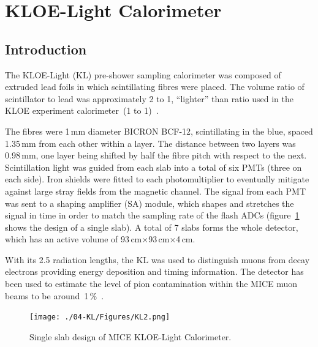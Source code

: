 \graphicspath{{04-KL/Figures/}}

\section{KLOE-Light Calorimeter}
\label{Sect:KL}

\subsection{Introduction}
\label{SubSect:KL_Intro}

The KLOE-Light (KL) pre-shower sampling calorimeter was composed of extruded lead foils in which scintillating fibres were placed. The volume ratio of scintillator to lead was approximately 2 to 1, ``lighter'' than ratio used in the KLOE experiment calorimeter~(1 to 1)~\cite{Ambrosino:2009zza}.

The fibres were 1\,mm diameter BICRON BCF-12, scintillating in the blue, spaced 1.35\,mm from each other within a layer. The distance between two layers was 0.98\,mm, one layer being shifted by half the fibre pitch with respect to the next.
Scintillation light was guided from each slab into a total of six PMTs (three on each side). Iron shields were fitted to each photomultiplier to
eventually mitigate against large stray fields from the magnetic channel. The signal from each PMT was sent to a shaping amplifier (SA) module, which shapes and stretches the signal in time in order to match the sampling rate of the flash ADCs (figure~\ref{fig:KL2} shows the design of a single slab).
A total of 7 slabs forms the whole detector, which has an active volume of 93\,cm$\times$93\,cm$\times$4\,cm.

With its 2.5 radiation lengths, the KL was used to distinguish muons from decay electrons providing energy deposition and timing information.
The detector has been used to estimate the level of pion contamination within the MICE muon beams to be around~1\,\%~\cite{2016JInst..11P3001A}.
\begin{figure}[htb!]
  \begin{center}
    \texttt{[image: ./04-KL/Figures/KL2.png]}
    \caption{Single slab design of MICE KLOE-Light Calorimeter.}
    \label{fig:KL2}
  \end{center}
\end{figure}



